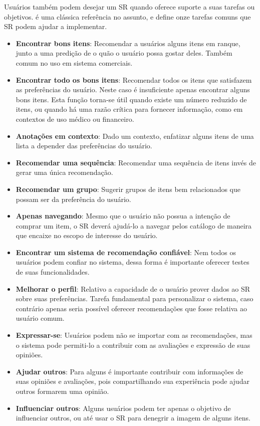 Usuários também podem desejar um SR quando oferece suporte a suas tarefas ou objetivos. \cite{Herlocker:2004:ECF:963770.963772} é uma clássica referência no assunto, e define onze tarefas comuns que SR podem ajudar a implementar. 

\begin{itemize}
	\item{\textbf{Encontrar bons itens}: Recomendar a usuários alguns itens em ranque, junto a uma predição de o quão o usuário possa gostar deles. Também comum no uso em sistema comerciais.}

	\item{\textbf{Encontrar todo os bons itens}: Recomendar todos os itens que satisfazem as preferências do usuário. Neste caso é insuficiente apenas encontrar alguns bons itens. Esta função torna-se útil quando existe um número reduzido de itens, ou quando há uma razão crítica para fornecer informação, como em contextos de uso médico ou financeiro.}

	\item{\textbf{Anotações em contexto}: Dado um contexto, enfatizar alguns itens de uma lista a depender das preferências do usuário.}

	\item{\textbf{Recomendar uma sequência}: Recomendar uma sequência de itens invés de gerar uma única recomendação.}

	\item{\textbf{Recomendar um grupo}: Sugerir grupos de itens bem relacionados que possam ser da preferência do usuário.}

	\item{\textbf{Apenas navegando}: Mesmo que o usuário não possua a intenção de comprar um item, o SR deverá ajudá-lo a navegar pelos catálogo de maneira que encaixe no escopo de interesse do usuário.}

	\item{\textbf{Encontrar um sistema de recomendação confiável}: Nem todos os usuários podem confiar no sistema, dessa forma é importante oferecer testes de suas funcionalidades.}

	\item{\textbf{Melhorar o perfil}: Relativo a capacidade de o usuário prover dados ao SR sobre suas preferências. Tarefa fundamental para personalizar o sistema, caso contrário apenas seria possível oferecer recomendações que fosse relativa ao usuário comum.}

	\item{\textbf{Expressar-se}: Usuários podem não se importar com as recomendações, mas o sistema pode permiti-lo a contribuir com as avaliações e expressão de suas opiniões.}

	\item{\textbf{Ajudar outros}: Para alguns é importante contribuir com informações de suas opiniões e avaliações, pois compartilhando sua experiência pode ajudar outros formarem uma opinião.}

	\item{\textbf{Influenciar outros}: Alguns usuários podem ter apenas o objetivo de influenciar outros, ou até usar o SR para denegrir a imagem de alguns itens.}
\end{itemize}

